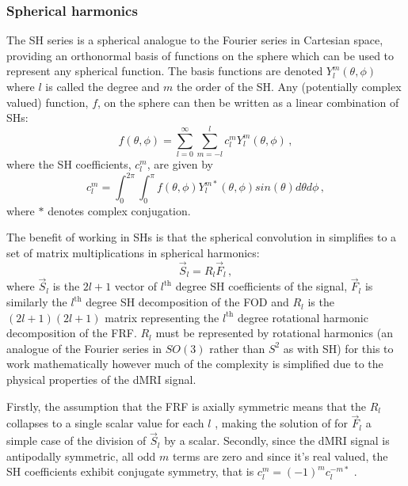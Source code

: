 \subsubsection{Spherical harmonics}
\label{sec:bg_spherical_harmonics}
The \acl{SH} series is a spherical analogue to the Fourier series in Cartesian space, providing an orthonormal basis of functions on the sphere which can be used to represent any spherical function.
The basis functions are denoted $Y_l^m(\theta, \phi)$ where $l$ is called the degree and $m$ the order of the \ac{SH}. Any (potentially complex valued) function, $f$, on the sphere can then be written as a linear combination of \acp{SH}:
\begin{equation}
  f(\theta, \phi) = \sum_{l=0}^\infty \sum_{m=-l}^l c_l^m Y_l^m(\theta, \phi) \,,
  \label{eq:bg_sh}
\end{equation}
where the \ac{SH} coefficients, $c_l^m$, are given by
\begin{equation}
  c_l^m = \int_0^{2\pi} \int_0^\pi f(\theta, \phi) Y_l^{m*}(\theta, \phi) sin(\theta) d\theta d\phi\,,
\end{equation}
where $*$ denotes complex conjugation.

The benefit of working in \acp{SH} is that the spherical convolution in  simplifies to a set of matrix multiplications in spherical harmonics:
\begin{equation}
  \vec{S}_l = R_l \vec{F}_l\,,
  \label{eq:bg_sd_matrix}
\end{equation}
where $\vec{S}_l$ is the $2l + 1$ vector of $l^{\mathrm{th}}$ degree \ac{SH} coefficients of the signal, $\vec{F}_l$ is similarly the $l^{\mathrm{th}}$ degree \ac{SH} decomposition of the \ac{FOD} and $R_l$ is the $(2l+1)(2l+1)$ matrix representing the $l^{\mathrm{th}}$ degree rotational harmonic decomposition of the \ac{FRF}.
$R_l$ must be represented by rotational harmonics (an analogue of the Fourier series in $SO(3)$ rather than $S^2$ as with \ac{SH}) for this to work mathematically \cite{Healy1998,Tournier2004} however much of the complexity is simplified due to the physical properties of the \ac{dMRI} signal.

Firstly, the assumption that the \ac{FRF} is axially symmetric means that the $R_l$ collapses to a single scalar value for each $l$ \cite{Tournier2004}, making the solution of  for $\vec{F}_l$ a simple case of the division of $\vec{S}_l$ by a scalar. Secondly, since the \ac{dMRI} signal is antipodally symmetric, all odd $m$ terms are zero and since it's real valued, the \ac{SH} coefficients exhibit conjugate symmetry, that is $c_l^m = (-1)^mc_l^{-m*}$ \cite{Tournier2004,Alexander2002}.


